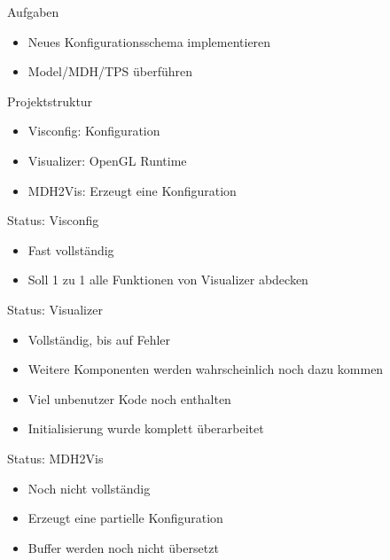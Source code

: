 \documentclass{../presentation}
\begin{document}
\frame[plain]{\titlepage}

\begin{frame}{Aufgaben}
    \begin{itemize}
        \item Neues Konfigurationsschema implementieren
        \item Model/MDH/TPS überführen
    \end{itemize}
\end{frame}

\begin{frame}{Projektstruktur}
    \begin{itemize}
        \item Visconfig: Konfiguration
        \item Visualizer: OpenGL Runtime
        \item MDH2Vis: Erzeugt eine Konfiguration
    \end{itemize}
\end{frame}

\begin{frame}{Status: Visconfig}
    \begin{itemize}
        \item Fast vollständig
        \item Soll 1 zu 1 alle Funktionen von Visualizer abdecken
    \end{itemize}
\end{frame}

\begin{frame}{Status: Visualizer}
    \begin{itemize}
        \item Vollständig, bis auf Fehler
        \item Weitere Komponenten werden wahrscheinlich noch dazu kommen
        \item Viel unbenutzer Kode noch enthalten
        \item Initialisierung wurde komplett überarbeitet
    \end{itemize}
\end{frame}

\begin{frame}{Status: MDH2Vis}
    \begin{itemize}
        \item Noch nicht vollständig
        \item Erzeugt eine partielle Konfiguration
        \item Buffer werden noch nicht übersetzt
    \end{itemize}
\end{frame}
\end{document}
